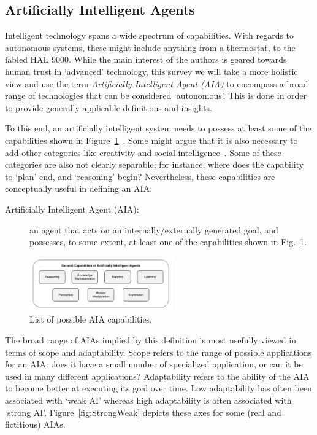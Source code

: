 \subsection{Artificially Intelligent Agents} \label{sec:aias}
    Intelligent technology spans a wide spectrum of capabilities. With regards to autonomous systems, these might include anything from a thermostat, to the fabled HAL 9000. While the main interest of the authors is geared towards human trust in `advanced' technology, this survey we will take a more holistic view and use the term \textit{Artificially Intelligent Agent (AIA)} to encompass a broad range of technologies that can be considered `autonomous'. This is done in order to provide generally applicable definitions and insights. 

    To this end, an artificially intelligent system needs to possess at least some of the capabilities shown in Figure~\ref{fig:AIcapabilities}~\cite{Russell2010-wv,Nilsson2009-rp,Luger2008-vf}. Some might argue that it is also necessary to add other categories like creativity and social intelligence~\cite{Tao2005-kh}. 
    Some of these categories are also not clearly separable; for instance, where does the capability to `plan' end, and `reasoning' begin? Nevertheless, these capabilities are conceptually useful in defining an AIA:     
    \begin{description}
        \item[Artificially Intelligent Agent (AIA):] an agent that acts on an internally/externally generated goal, and possesses, to some extent, at least one of the capabilities shown in Fig.~\ref{fig:AIcapabilities}.
    \end{description}

	\begin{figure}[htbp]
    	\centering
     	\includegraphics[width=0.55\textwidth]{Figures/AI_capabilities}
    	\caption{List of possible AIA capabilities.}
        \label{fig:AIcapabilities}
    \end{figure}

    The broad range of AIAs implied by this definition is most usefully viewed in terms of scope and adaptability. Scope refers to the range of possible applications for an AIA: does it have a small number of specialized application, or can it be used in many different applications? Adaptability refers to the ability of the AIA to become better at executing its goal over time. Low adaptability has often been associated with `weak AI' whereas high adaptability is often associated with `strong AI'.  Figure~\ref{fig:StrongWeak} depicts these axes for some (real and fictitious) AIAs.


